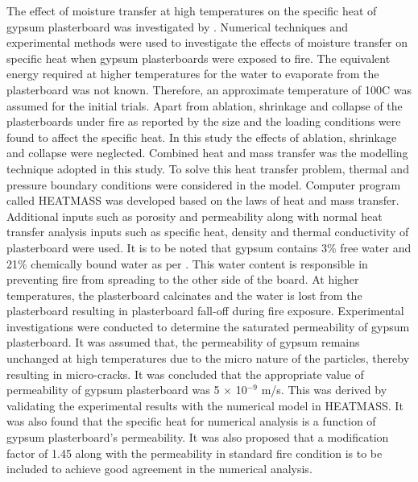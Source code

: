 The effect of moisture transfer at high temperatures on the specific heat of gypsum plasterboard was investigated by \citet{Ang2009}. Numerical techniques and experimental methods were used to investigate the effects of moisture transfer on specific heat when gypsum plasterboards were exposed to fire. The equivalent energy required at higher temperatures for the water to evaporate from the plasterboard was not known. Therefore, an approximate temperature of 100\degree C was assumed for the initial trials. Apart from ablation, shrinkage and collapse of the plasterboards under fire as reported by \citet{Jones2001} the size and the loading conditions were found to affect the specific heat. In this study the effects of ablation, shrinkage and collapse were neglected. Combined heat and mass transfer was the modelling technique adopted in this study. To solve this heat transfer problem, thermal and pressure boundary conditions were considered in the model. Computer program called HEATMASS was developed based on the laws of heat and mass transfer. Additional inputs such as porosity and permeability along with normal heat transfer analysis inputs such as specific heat, density and thermal conductivity of plasterboard were used. It is to be noted that gypsum contains 3\% free water and 21\% chemically bound water as per \citet{Mehaffey1994}. This water content is responsible in preventing fire from spreading to the other side of the board. At higher temperatures, the plasterboard calcinates and the water is lost from the plasterboard resulting in plasterboard fall-off during fire exposure. Experimental investigations were conducted to determine the saturated permeability of gypsum plasterboard. It was assumed that, the permeability of gypsum remains unchanged at high temperatures due to the micro nature of the particles, thereby resulting in micro-cracks. It was concluded that the appropriate value of permeability of gypsum plasterboard was 5 $\times$ 10$^{-9}$ m/s. This was derived by validating the experimental results with the numerical model in HEATMASS. It was also found that the specific heat for numerical analysis is a function of gypsum plasterboard's permeability. It was also proposed that a modification factor of 1.45 along with the permeability in standard fire condition is to be included to achieve good agreement in the numerical analysis. 

